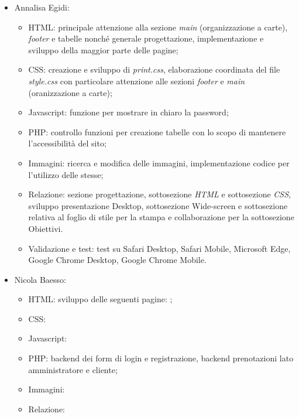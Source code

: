 \documentclass[]{article}
\begin{document}
\begin{itemize}
\begin{itemize}
	\end{itemize} 
	\item Annalisa Egidi:
	\begin{itemize}
		\item HTML: principale attenzione alla sezione \textit{main} (organizzazione a carte), \textit{footer} e tabelle nonché generale progettazione, implementazione e sviluppo della maggior parte delle pagine;
		\item CSS: creazione e sviluppo di \textit{print.css}, elaborazione coordinata del file \textit{style.css} con particolare attenzione alle sezioni \textit{footer} e \textit{main} (oranizzazione a carte);
		\item Javascript: funzione per mostrare in chiaro la password;
		\item PHP: controllo funzioni per creazione tabelle con lo scopo di mantenere l'accessibilità del sito;
		\item Immagini: ricerca e modifica delle immagini, implementazione codice per l'utilizzo delle stesse;
		\item Relazione: sezione progettazione, sottosezione \textit{HTML} e sottosezione \textit{CSS}, sviluppo presentazione Desktop, sottosezione Wide-screen e sottosezione relativa al foglio di stile per la stampa e collaborazione per la sottosezione Obiettivi.
		\item Validazione e test: test su Safari Desktop, Safari Mobile, Microsoft Edge, Google Chrome Desktop, Google Chrome Mobile.
	\end{itemize} 
	\item Nicola Baesso:
	\begin{itemize}
		\item HTML: sviluppo delle seguenti pagine: ;
		\item CSS:
		\item Javascript:
		\item PHP: backend dei form di login e registrazione, backend prenotazioni lato amministratore e cliente;
		\item Immagini:
		\item Relazione:
	\end{itemize} 
\end{itemize}
\end{document}

